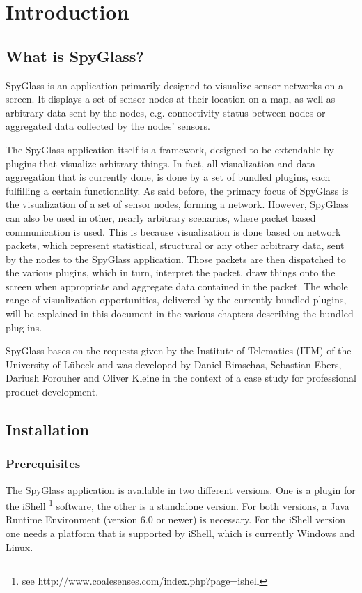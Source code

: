 \section{Introduction}
\label{section:s_introduction}

	\subsection{What is SpyGlass?}
		SpyGlass is an application primarily designed to visualize sensor networks on 
		a screen. It displays a set of sensor nodes at their location on a map, as well 
		as arbitrary data sent by the nodes, e.g. connectivity status between nodes or 
		aggregated data collected by the nodes’ sensors.
	
		The SpyGlass application itself is a framework, designed to be extendable by 
		plugins that visualize arbitrary things. In fact, all visualization and data aggregation
		that is currently done, is done by a set of bundled plugins, each fulfilling a 
		certain functionality. As said before, the primary focus of SpyGlass is the
		visualization of a set of sensor nodes, forming a network. However, SpyGlass can
		also be used in other, nearly arbitrary scenarios, where packet based communication 
		is used. This is because visualization is done based on network packets, 
		which represent statistical, structural or any other arbitrary data, sent by the 
		nodes to the SpyGlass application. Those packets are then dispatched to the 
		various plugins, which in turn, interpret the packet, draw things onto the screen 
		when appropriate and aggregate data contained in the packet. The whole range of visualization 
		opportunities, delivered by the currently bundled plugins, will be explained in 
		this document in the various chapters describing the bundled plug ins.
		
		SpyGlass bases on the requests given by the Institute of Telematics (ITM) of 
		the University of Lübeck and was developed by Daniel Bimschas, Sebastian 
		Ebers, Dariush Forouher and Oliver Kleine in the context of a case study for 
		professional product development.

	\subsection{Installation}
	
		\subsubsection{Prerequisites}
			The SpyGlass application is available in two different versions. One is a plugin 
			for the iShell \footnote{see http://www.coalesenses.com/index.php?page=ishell}
			software, the other is a standalone version. For both versions, a 
			Java Runtime Environment (version 6.0 or newer) is necessary. For the iShell 
			version one needs a platform that is supported by iShell, which is currently 
			Windows and Linux.


